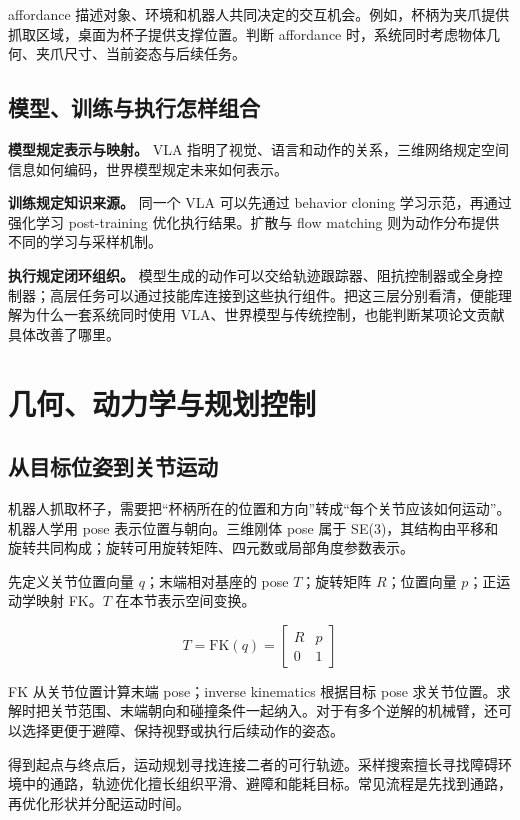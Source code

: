 \documentclass[UTF8,a4paper,11pt,oneside,openany,fontset=none]{ctexbook}
\begin{document}
affordance 描述对象、环境和机器人共同决定的交互机会。例如，杯柄为夹爪提供抓取区域，桌面为杯子提供支撑位置。判断 affordance 时，系统同时考虑物体几何、夹爪尺寸、当前姿态与后续任务。

\section{模型、训练与执行怎样组合}

\textbf{模型规定表示与映射。} VLA 指明了视觉、语言和动作的关系，三维网络规定空间信息如何编码，世界模型规定未来如何表示。

\textbf{训练规定知识来源。} 同一个 VLA 可以先通过 behavior cloning 学习示范，再通过强化学习 post-training 优化执行结果。扩散与 flow matching 则为动作分布提供不同的学习与采样机制。

\textbf{执行规定闭环组织。} 模型生成的动作可以交给轨迹跟踪器、阻抗控制器或全身控制器；高层任务可以通过技能库连接到这些执行组件。把这三层分别看清，便能理解为什么一套系统同时使用 VLA、世界模型与传统控制，也能判断某项论文贡献具体改善了哪里。

\chapter{几何、动力学与规划控制}

\section{从目标位姿到关节运动}

机器人抓取杯子，需要把``杯柄所在的位置和方向''转成``每个关节应该如何运动''。机器人学用 pose 表示位置与朝向。三维刚体 pose 属于 SE(3)，其结构由平移和旋转共同构成；旋转可用旋转矩阵、四元数或局部角度参数表示。

先定义关节位置向量 \(q\)；末端相对基座的 pose \(T\)；旋转矩阵 \(R\)；位置向量 \(p\)；正运动学映射 FK。\(T\) 在本节表示空间变换。

\[
T=\mathrm{FK}(q)=\begin{bmatrix}R&p\\0&1\end{bmatrix}
\]

FK 从关节位置计算末端 pose；inverse kinematics 根据目标 pose 求关节位置。求解时把关节范围、末端朝向和碰撞条件一起纳入。对于有多个逆解的机械臂，还可以选择更便于避障、保持视野或执行后续动作的姿态。

得到起点与终点后，运动规划寻找连接二者的可行轨迹。采样搜索擅长寻找障碍环境中的通路，轨迹优化擅长组织平滑、避障和能耗目标。常见流程是先找到通路，再优化形状并分配运动时间。
\end{document}
